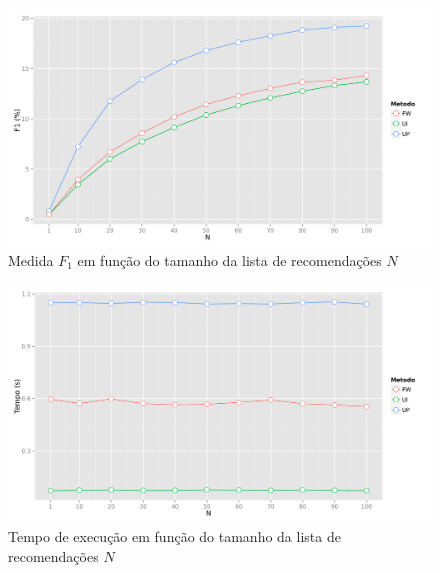 {\begin{figure}[hp]
    \begin{center}
    \includegraphics[width=1\textwidth]{img/F1_N}
    \end{center}
    \caption{Medida $F_1$ em função do tamanho da lista de recomendações $N$}
    \label{fig:F1_N}
\end{figure}

\begin{figure}[hp]
    \begin{center}
    \includegraphics[width=1\textwidth]{img/time_N}
    \end{center}
    \caption{Tempo de execução em função do tamanho da lista de recomendações $N$}
    \label{fig:time_N}
\end{figure}

}
